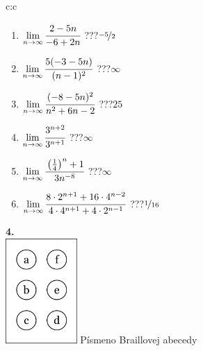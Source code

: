 \documentclass[10pt]{report}
\begin{document}
\begin{tabular}{c:c}
\begin{minipage}[c][104.5mm][t]{0.5\linewidth}
\begin{center}
\begin{minipage}{0.79\linewidth}
\begin{center}
\begin{varwidth}{\linewidth}
\begin{enumerate}
\normalsize
\item $\lim\limits_{n\to\infty}\cfrac{2-5n}{-6+2n}$\quad \dotfill\; ???\;\dotfill \quad $\nicefrac{-5}{2}$
\item $\lim\limits_{n\to\infty}\cfrac{5(-3-5n)}{(n-1)^2}$\quad \dotfill\; ???\;\dotfill \quad $\infty$
\item $\lim\limits_{n\to\infty}\cfrac{(-8-5n)^2}{n^2+6n-2}$\quad \dotfill\; ???\;\dotfill \quad $25$
\item $\lim\limits_{n\to\infty}\cfrac{3^{n+2}}{3^{n+1}}$\quad \dotfill\; ???\;\dotfill \quad $\infty$
\item $\lim\limits_{n\to\infty}\cfrac{\left(\frac{1}{4}\right)^n +1}{3n^{-8}}$\quad \dotfill\; ???\;\dotfill \quad $\infty$
\item $\lim\limits_{n\to\infty}\cfrac{8\cdot 2^{n+1}+16\cdot 4^{n-2}}{4\cdot 4^{n+1}+4\cdot 2^{n-1}}$\quad \dotfill\; ???\;\dotfill \quad $\nicefrac{1}{16}$
\end{enumerate}
\end{varwidth}
\end{center}
\end{minipage}
\begin{minipage}{0.20\linewidth}
\begin{center}
{\Huge\bfseries 4.} \\[2mm]
\includegraphics[height=40mm]{../images/braille.png}
{\small Písmeno Braillovej abecedy}
\end{center}
\end{minipage}
\end{center}
\end{minipage}
%
\end{tabular}
\newpage
\thispagestyle{empty}
\end{document}
